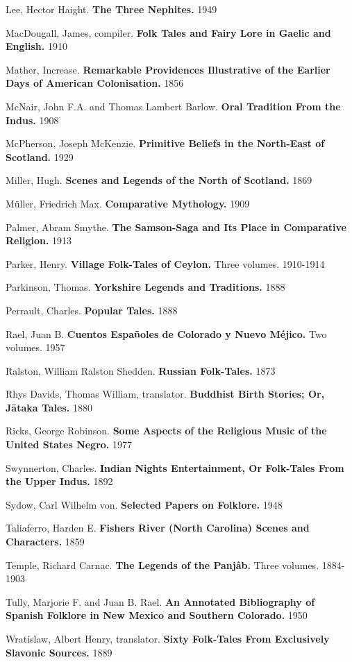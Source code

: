 \documentclass[14pt,a4paper]{memoir}
\begin{document}
{{Lee, Hector Haight. \textbf{The Three Nephites.} 1949

MacDougall, James, compiler. \textbf{Folk Tales and Fairy Lore in Gaelic
and English.} 1910

Mather, Increase. \textbf{Remarkable Providences Illustrative of the
Earlier Days of American Colonisation.} 1856

McNair, John F.A. and Thomas Lambert Barlow. \textbf{Oral Tradition From
the Indus.} 1908

McPherson, Joseph McKenzie. \textbf{Primitive Beliefs in the North-East
of Scotland.} 1929

Miller, Hugh. \textbf{Scenes and Legends of the North of Scotland.} 1869

Müller, Friedrich Max. \textbf{Comparative Mythology.} 1909

Palmer, Abram Smythe. \textbf{The Samson-Saga and Its Place in
Comparative Religion.} 1913

Parker, Henry. \textbf{Village Folk-Tales of Ceylon.} Three volumes.
1910-1914

Parkinson, Thomas. \textbf{Yorkshire Legends and Traditions.} 1888

Perrault, Charles. \textbf{Popular Tales.} 1888

Rael, Juan B. \textbf{Cuentos Españoles de Colorado y Nuevo Méjico.} Two
volumes. 1957

Ralston, William Ralston Shedden. \textbf{Russian Folk-Tales.} 1873

Rhys Davids, Thomas William, translator. \textbf{Buddhist Birth Stories;
Or, Jātaka Tales.} 1880

Ricks, George Robinson. \textbf{Some Aspects of the Religious Music of
the United States Negro.} 1977

Swynnerton, Charles. \textbf{Indian Nights\textquotesingle{}
Entertainment, Or Folk-Tales From the Upper Indus.} 1892

Sydow, Carl Wilhelm von. \textbf{Selected Papers on Folklore.} 1948

Taliaferro, Harden E. \textbf{Fisher\textquotesingle s River (North
Carolina) Scenes and Characters.} 1859

Temple, Richard Carnac. \textbf{The Legends of the Panjâb.} Three
volumes. 1884-1903

Tully, Marjorie F. and Juan B. Rael. \textbf{An Annotated Bibliography
of Spanish Folklore in New Mexico and Southern Colorado.} 1950

Wratislaw, Albert Henry, translator. \textbf{Sixty Folk-Tales From
Exclusively Slavonic Sources.} 1889

}}
\end{document}
